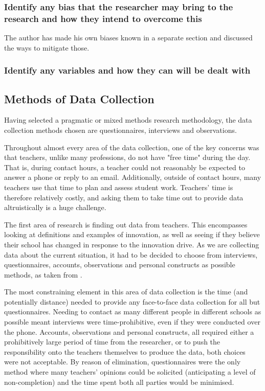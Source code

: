 \subsubsection{Identify any bias that the researcher may bring to the research and how they intend to overcome this}

The author has made his own biases known in a separate section and discussed the ways to mitigate those.

\subsubsection{Identify any variables and how they can will be dealt with}

\subsection{Methods of Data Collection}
Having selected a pragmatic or mixed methods research methodology, the data collection methods chosen are questionnaires, interviews and observations.

Throughout almost every area of the data collection, one of the key concerns was that teachers, unlike many professions, do not have "free time" during the day. That is, during contact hours, a teacher could not reasonably be expected to answer a phone or reply to an email. Additionally, outside of contact hours, many teachers use that time to plan and assess student work. Teachers' time is therefore relatively costly, and asking them to take time out to provide data altruistically is a huge challenge.

The first area of research is finding out data from teachers. This encompasses looking at definitions and examples of innovation, as well as seeing if they believe their school has changed in response to the innovation drive. As we are collecting data about the current situation, it had to be decided to choose from interviews, questionnaires, accounts, observations and personal constructs as possible methods, as taken from \citet{Cohen2005}.

The most constraining element in this area of data collection is the time (and potentially distance) needed to provide any face-to-face data collection for all but questionnaires. Needing to contact as many different people in different schools as possible meant interviews were time-prohibitive, even if they were conducted over the phone. Accounts, observations and personal constructs, all required either a prohibitively large period of time from the researcher, or to push the responsibility onto the teachers themselves to produce the data, both choices were not acceptable. By reason of elimination, questionnaires were the only method where many teachers' opinions could be solicited (anticipating a level of non-completion) and the time spent both all parties would be minimised. 

